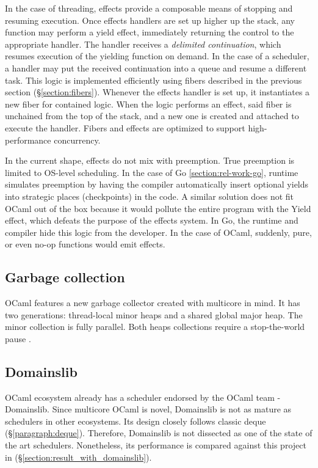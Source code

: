 \documentclass[12pt,a4paper,twoside]{report}
\begin{document}
In the case of threading, effects provide a composable means of stopping and resuming execution. Once effects handlers are set up higher up the stack, any function may perform a yield effect, immediately returning the control to the appropriate handler. The handler receives a \textit{delimited continuation}, which resumes execution of the yielding function on demand. In the case of a scheduler, a handler may put the received continuation into a queue and resume a different task. This logic is implemented efficiently using fibers described in the previous section (\S\ref{section:fibers}). Whenever the effects handler is set up, it instantiates a new fiber for contained logic. When the logic performs an effect, said fiber is unchained from the top of the stack, and a new one is created and attached to execute the handler. Fibers and effects are optimized to support high-performance concurrency. 

\label{paragraph:ocaml_preemption}
In the current shape, effects do not mix with preemption. True preemption is limited to OS-level scheduling. In the case of Go \ref{section:rel-work-go}, runtime simulates preemption by having the compiler automatically insert optional yields into strategic places (checkpoints) in the code. A similar solution does not fit OCaml out of the box because it would pollute the entire program with the Yield effect, which defeats the purpose of the effects system. In Go, the runtime and compiler hide this logic from the developer. In the case of OCaml, suddenly, pure, or even no-op functions would emit effects.

\subsection{Garbage collection}
\label{section:gc}
OCaml features a new garbage collector created with multicore in mind. It has two generations: thread-local minor heaps and a shared global major heap. The minor collection is fully parallel. Both heaps collections require a stop-the-world pause \cite{Sivaramakrishnan2020}.


\subsection{Domainslib}

OCaml ecosystem already has a scheduler endorsed by the OCaml team \cite{ocamlmul59:online} - Domainslib. Since multicore OCaml is novel, Domainslib is not as mature as schedulers in other ecosystems. Its design closely follows classic deque (\S\ref{paragraph:deque}). Therefore, Domainslib is not dissected as one of the state of the art schedulers. Nonetheless, its performance is compared against this project in (\S\ref{section:result_with_domainslib}).
\end{document}
